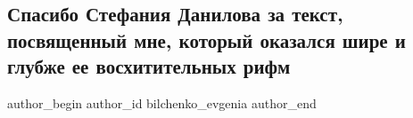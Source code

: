  
 
 
 
 
 
\subsection{Спасибо Стефания Данилова за текст, посвященный мне, который оказался шире и глубже ее восхитительных рифм}
\label{sec:10_06_2021.fb.bilchenko_evgenia.2.poezia_stefania_danilova}
\ifcmt
 author_begin
   author_id bilchenko_evgenia
 author_end
\fi
